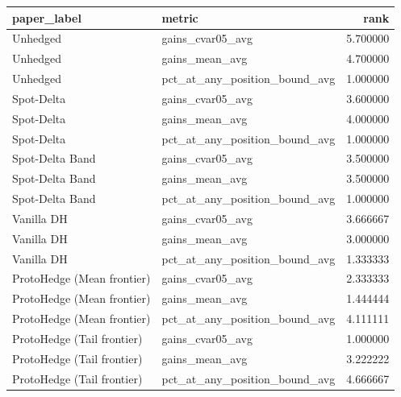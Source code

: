 \begin{tabular}{llr}
\toprule
paper_label & metric & rank \\
\midrule
Unhedged & gains_cvar05_avg & 5.700000 \\
Unhedged & gains_mean_avg & 4.700000 \\
Unhedged & pct_at_any_position_bound_avg & 1.000000 \\
Spot-Delta & gains_cvar05_avg & 3.600000 \\
Spot-Delta & gains_mean_avg & 4.000000 \\
Spot-Delta & pct_at_any_position_bound_avg & 1.000000 \\
Spot-Delta Band & gains_cvar05_avg & 3.500000 \\
Spot-Delta Band & gains_mean_avg & 3.500000 \\
Spot-Delta Band & pct_at_any_position_bound_avg & 1.000000 \\
Vanilla DH & gains_cvar05_avg & 3.666667 \\
Vanilla DH & gains_mean_avg & 3.000000 \\
Vanilla DH & pct_at_any_position_bound_avg & 1.333333 \\
ProtoHedge (Mean frontier) & gains_cvar05_avg & 2.333333 \\
ProtoHedge (Mean frontier) & gains_mean_avg & 1.444444 \\
ProtoHedge (Mean frontier) & pct_at_any_position_bound_avg & 4.111111 \\
ProtoHedge (Tail frontier) & gains_cvar05_avg & 1.000000 \\
ProtoHedge (Tail frontier) & gains_mean_avg & 3.222222 \\
ProtoHedge (Tail frontier) & pct_at_any_position_bound_avg & 4.666667 \\
\bottomrule
\end{tabular}
